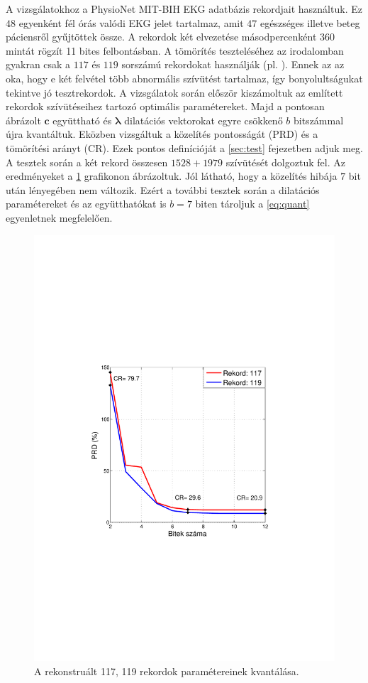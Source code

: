 \documentclass[oneside,titlepage,12pt,a4paper]{report}
\begin{document}
A vizsgálatokhoz a PhysioNet \cite{PhysioNet} MIT-BIH EKG adatbázis rekordjait használtuk. Ez $48$ egyenként fél órás valódi EKG jelet tartalmaz, amit $47$ egészséges illetve beteg páciensről gyűjtöttek össze. A rekordok két elvezetése másodpercenként $360$ mintát rögzít 11 bites felbontásban. A tömörítés teszteléséhez az irodalomban gyakran csak a $117$ és $119$ sorszámú rekordokat használják (pl. \cite{jpeg2000ECG, waveletECG}). Ennek az az oka, hogy e két felvétel több abnormális szívütést tartalmaz, így bonyolultságukat tekintve jó tesztrekordok. A vizsgálatok során először kiszámoltuk az említett rekordok szívütéseihez tartozó optimális paramétereket. Majd a pontosan ábrázolt $\mathbf{c}$ együttható és $\boldsymbol{\lambda}$ dilatációs vektorokat egyre csökkenő $b$ bitszámmal újra kvantáltuk. Eközben vizsgáltuk a közelítés pontosságát (PRD) és a tömörítési arányt (CR). Ezek pontos definícióját a \ref{sec:test} fejezetben adjuk meg. A tesztek során a két rekord összesen $1528+1979$ szívütését dolgoztuk fel. Az eredményeket a \ref{fig:quant} grafikonon ábrázoltuk. Jól látható, hogy a közelítés hibája $7$ bit után lényegében nem változik. Ezért a további tesztek során a dilatációs paramétereket és az együtthatókat is $b=7$ biten tároljuk a \eqref{eq:quant} egyenletnek megfelelően.
\begin{figure}[htb!]
\centering
\includegraphics[scale=0.4,trim=100 260 100 255,clip]{./Abrak/Kvantalas/abra.pdf}%
\caption{A rekonstruált 117, 119 rekordok paramétereinek kvantálása.}%
\label{fig:quant}%
\end{figure}
\end{document}
